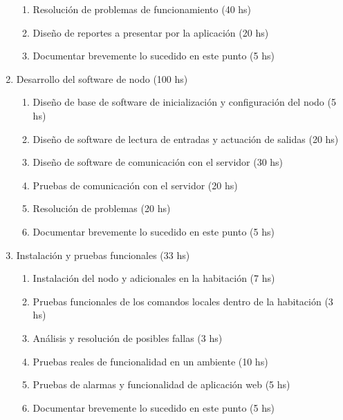 \documentclass[
11pt, %
]{charter}
\begin{document}
\begin{enumerate}
\begin{enumerate}
		\item Resolución de problemas de funcionamiento (40 hs)
		\item Diseño de reportes a presentar por la aplicación (20 hs)
		\item Documentar brevemente lo sucedido en este punto (5 hs)
	\end{enumerate}
\item Desarrollo del software de nodo (100 hs)
	\begin{enumerate}
		\item Diseño de base de software de inicialización y configuración del nodo (5 hs)
		\item Diseño de software de lectura de entradas y actuación de salidas (20 hs)
		\item Diseño de software de comunicación con el servidor (30 hs)
		\item Pruebas de comunicación con el servidor (20 hs)
		\item Resolución de problemas (20 hs)
		\item Documentar brevemente lo sucedido en este punto (5 hs)
	\end{enumerate}
\item Instalación y pruebas funcionales (33 hs)
	\begin{enumerate}
		\item Instalación del nodo y adicionales en la habitación (7 hs)
		\item Pruebas funcionales de los comandos locales dentro de la habitación (3 hs)
		\item Análisis y resolución de posibles fallas (3 hs)
		\item Pruebas reales de funcionalidad en un ambiente (10 hs)
		\item Pruebas de alarmas y funcionalidad de aplicación web (5 hs)
		\item Documentar brevemente lo sucedido en este punto (5 hs)
	\end{enumerate}
\end{enumerate}
\end{document}
